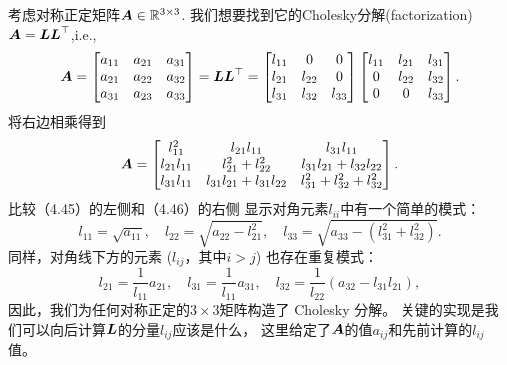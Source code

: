 \begin{example}[Cholesky分解]
考虑对称正定矩阵$\boldsymbol{A} \in \mathbb{R}^{3 \times 3}$.
我们想要找到它的Cholesky分解(factorization)$\boldsymbol{A} = \boldsymbol{L}\boldsymbol{L}^\top$,i.e.,
\begin{equation}
    \boldsymbol{A} =
    \begin{bmatrix}
        a_{11} & a_{21} & a_{31} \\
        a_{21} & a_{22} & a_{32} \\
        a_{31} & a_{23} & a_{33}
    \end{bmatrix} =
    \boldsymbol{L}\boldsymbol{L}^\top =
    \begin{bmatrix}
        l_{11} & 0 & 0 \\
        l_{21} & l_{22} & 0 \\
        l_{31} & l_{32} & l_{33}
    \end{bmatrix}
    \begin{bmatrix}
        l_{11} & l_{21}  & l_{31} \\
        0 & l_{22} & l_{32} \\
        0 & 0 & l_{33}
    \end{bmatrix}.
\end{equation}
将右边相乘得到
\begin{equation}
    \boldsymbol{A} =
    \begin{bmatrix}
        l_{11}^2 & l_{21}l_{11} & l_{31}l_{11} \\
        l_{21}l_{11} & l_{21}^2 + l_{22}^2 & l_{31}l_{21} + l_{32}l_{22} \\
        l_{31}l_{11} & l_{31}l_{21} + l_{31}l_{22} & l_{31}^2 + l_{32}^2 + l_{32}^2
    \end{bmatrix}.
\end{equation}
比较（4.45）的左侧和（4.46）的右侧
显示对角元素$l_{ii}$中有一个简单的模式：
\begin{equation}
    l_{11} = \sqrt{a_{11}},\quad
    l_{22} = \sqrt{a_{22}-l_{21}^2},\quad
    l_{33} = \sqrt{a_{33}-(l_{31}^2+l_{32}^2)}.
\end{equation}
同样，对角线下方的元素 ($l_{ij}$，其中$i > j$) 也存在重复模式：
\begin{equation}
    l_{21} = \frac{1}{l_{11}} a_{21},\quad
    l_{31} = \frac{1}{l_{11}} a_{31},\quad
    l_{32} = \frac{1}{l_{22}}(a_{32} - l_{31}l_{21}),
\end{equation}
因此，我们为任何对称正定的$3 × 3$矩阵构造了 Cholesky 分解。
关键的实现是我们可以向后计算$\boldsymbol{L}$的分量$l_{ij}$应该是什么，
这里给定了$\boldsymbol{A}$的值$a_{ij}$和先前计算的$l_{ij}$值。
\end{example}


